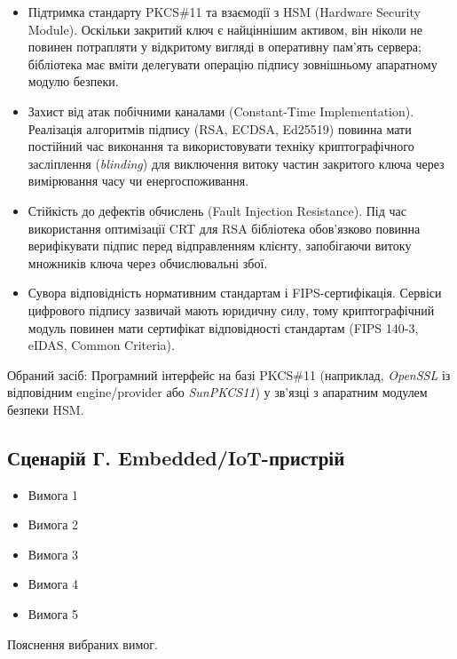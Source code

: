 \begin{itemize}
    \item Підтримка стандарту PKCS\#11 та взаємодії з HSM (Hardware Security Module). Оскільки закритий ключ є найціннішим активом, він ніколи не повинен потрапляти у відкритому вигляді в оперативну пам'ять сервера; бібліотека має вміти делегувати операцію підпису зовнішньому апаратному модулю безпеки.
    \item Захист від атак побічними каналами (Constant-Time Implementation). Реалізація алгоритмів підпису (RSA, ECDSA, Ed25519) повинна мати постійний час виконання та використовувати техніку криптографічного засліплення (\textit{blinding}) для виключення витоку частин закритого ключа через вимірювання часу чи енергоспоживання.
    \item Стійкість до дефектів обчислень (Fault Injection Resistance). Під час використання оптимізації CRT для RSA бібліотека обов'язково повинна верифікувати підпис перед відправленням клієнту, запобігаючи витоку множників ключа через обчислювальні збої.
    \item Сувора відповідність нормативним стандартам і FIPS-сертифікація. Сервіси цифрового підпису зазвичай мають юридичну силу, тому криптографічний модуль повинен мати сертифікат відповідності стандартам (FIPS 140-3, eIDAS, Common Criteria).
\end{itemize}

Обраний засіб: Програмний інтерфейс на базі PKCS\#11 (наприклад, \textit{OpenSSL} із відповідним engine/provider або \textit{SunPKCS11}) у зв'язці з апаратним модулем безпеки HSM.

\subsection{Сценарій Г. Embedded/IoT-пристрій}

\begin{itemize}
    \item Вимога 1
    \item Вимога 2
    \item Вимога 3
    \item Вимога 4
    \item Вимога 5
\end{itemize}

Пояснення вибраних вимог.
